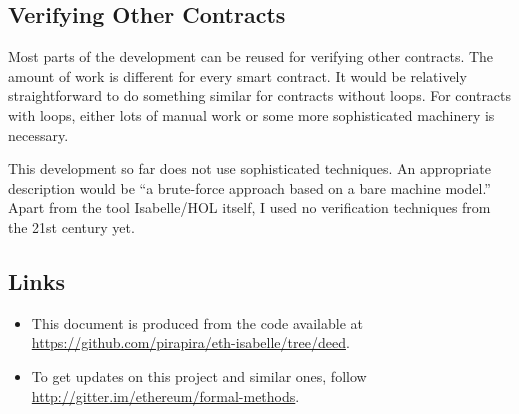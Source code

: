 \documentclass[11pt,a4paper]{article}
\begin{document}
\subsection{Verifying Other Contracts}

Most parts of the development can be reused for verifying other contracts.
The amount of work is
different for every smart contract.  It would be relatively
straightforward to do something similar for
contracts without loops.  For contracts with loops,
either lots of manual work or some more
sophisticated machinery is necessary.

This development so far does not use sophisticated techniques.
An appropriate description would be ``a brute-force approach based on a bare machine model.''
Apart from the tool Isabelle/HOL itself, I used no verification techniques from the 21st century yet.

\subsection{Links}

\begin{itemize}
\item This document is produced from the code available at
\url{https://github.com/pirapira/eth-isabelle/tree/deed}.
\item To get updates on this project and similar ones, follow \url{http://gitter.im/ethereum/formal-methods}.
\end{itemize}



%
%
\end{document}
